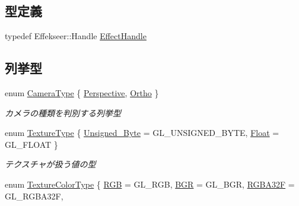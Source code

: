 \subsection*{型定義}
\begin{DoxyCompactItemize}
\item 
typedef Effekseer\+::\+Handle \mbox{\hyperlink{namespace_k___graphics_afb3a0fd0adc77eb95104e697c9b6b7a9}{Effect\+Handle}}
\end{DoxyCompactItemize}
\subsection*{列挙型}
\begin{DoxyCompactItemize}
\item 
enum \mbox{\hyperlink{namespace_k___graphics_a46f486e742ad696f88bfbeb22f8af10f}{Camera\+Type}} \{ \mbox{\hyperlink{namespace_k___graphics_a46f486e742ad696f88bfbeb22f8af10fa67cba19780ed061de0f9933d1ee626ff}{Perspective}}, 
\mbox{\hyperlink{namespace_k___graphics_a46f486e742ad696f88bfbeb22f8af10fa79fd68c41cf0b31996c9757c8563a835}{Ortho}}
 \}
\begin{DoxyCompactList}\small\item\em カメラの種類を判別する列挙型 \end{DoxyCompactList}\item 
enum \mbox{\hyperlink{namespace_k___graphics_a218722f1def83362c6b74680b8c1c529}{Texture\+Type}} \{ \mbox{\hyperlink{namespace_k___graphics_a218722f1def83362c6b74680b8c1c529ab0721b13f0b6d56efb5b01ac5c7eb718}{Unsigned\+\_\+\+Byte}} = G\+L\+\_\+\+U\+N\+S\+I\+G\+N\+E\+D\+\_\+\+B\+Y\+TE, 
\mbox{\hyperlink{namespace_k___graphics_a218722f1def83362c6b74680b8c1c529ad9523c239c3ce59f58cc0fc4a6e8986c}{Float}} = G\+L\+\_\+\+F\+L\+O\+AT
 \}
\begin{DoxyCompactList}\small\item\em テクスチャが扱う値の型 \end{DoxyCompactList}\item 
enum \mbox{\hyperlink{namespace_k___graphics_a9654dafb2cd6eaed24a292a6f8373955}{Texture\+Color\+Type}} \{ \newline
\mbox{\hyperlink{namespace_k___graphics_a9654dafb2cd6eaed24a292a6f8373955a3f86f41090b77da22356d9010d1c0f66}{R\+GB}} = G\+L\+\_\+\+R\+GB, 
\mbox{\hyperlink{namespace_k___graphics_a9654dafb2cd6eaed24a292a6f8373955a5982abbb33a2de38202a6a14430bfbd7}{B\+GR}} = G\+L\+\_\+\+B\+GR, 
\mbox{\hyperlink{namespace_k___graphics_a9654dafb2cd6eaed24a292a6f8373955a9e29ef1d15d53abfdf21fd7cc6730d25}{R\+G\+B\+A32F}} = G\+L\+\_\+\+R\+G\+B\+A32F, 

\end{DoxyCompactItemize}
